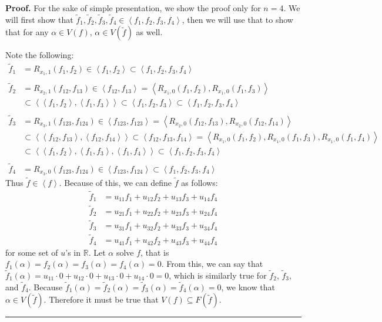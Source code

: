 \documentclass{article}%
\newenvironment{proof}[1][Proof]{\noindent\textbf{#1.} }{\ \rule{0.5em}{0.5em}}
\begin{document}
\begin{proof}
For the sake of simple presentation, we show the proof only for $n=4$. We will first show that $\tilde{f}_1,\tilde{f}_2,\tilde{f}_3,\tilde{f}_4\in \left<f_1,f_2,f_3,f_4\right>$, then we will use that to show that for any $\alpha\in V(f)$, $\alpha\in V(\tilde{f})$ as well.

Note the following:
\begin{align*}
    \tilde{f}_1&=R_{x_1,1}(f_1,f_2)\in \left< f_1,f_2\right>\subset \left< f_1, f_2, f_3, f_4 \right>\\
    \\
    \tilde{f}_{2}  &  =R_{x_{2},1}\left(  f_{12},f_{13}\right) \in \left<f_{12},f_{13}\right>=\left<   R_{x_1,0}\left(f_1,f_2\right),R_{x_1,0}\left(f_1,f_3\right) \right> \\
    &\subset \left<\left<f_1,f_2\right>,\left<f_1,f_3\right>\right>\subset \left<f_1,f_2,f_3\right>\subset\left<f_1,f_2,f_3,f_4\right>\\
    \\
    \tilde{f}_{3}  &  =R_{x_{3},1}\left(  f_{123},f_{124}\right) \in \left<f_{123},f_{123}\right>=\left<R_{x_2,0}(f_{12},f_{13}),R_{x_2,0}(f_{12},f_{14})\right>\\
    &\subset\left<\left<f_{12},f_{13}\right>,\left<f_{12},f_{14}\right>\right> \subset \left<f_{12},f_{13},f_{14}\right> = \left<R_{x_1,0}(f_1,f_2),R_{x_1,0}(f_1,f_3),R_{x_1,0}(f_1,f_4)\right>\\
    &\subset \left<\left<f_1,f_2\right>,\left<f_1,f_3\right>,\left<f_1,f_4\right>\right> \subset \left<f_1,f_2,f_3,f_4\right>\\
    \\
\tilde{f}_{4}  &  =R_{x_3,0}\left(f_{123},f_{124}\right) \in \left<f_{123},f_{124}\right> \subset \left<f_1,f_2,f_3,f_4\right>
\end{align*}
Thus $\tilde{f}\in\left< f \right>$. Because of this, we can define $\tilde{f}$ as follows:
\begin{align*}
\tilde{f}_1&=u_{11}f_1+u_{12}f_2+u_{13}f_3+u_{14}f_4\\
\tilde{f}_2&=u_{21}f_1+u_{22}f_2+u_{23}f_3+u_{24}f_4\\
\tilde{f}_3&=u_{31}f_1+u_{32}f_2+u_{33}f_3+u_{34}f_4\\
\tilde{f}_4&=u_{41}f_1+u_{42}f_2+u_{43}f_3+u_{44}f_4
\end{align*}
for some set of $u$'s in $\mathbb{R}$. Let $\alpha$ solve $f$, that is $f_1(\alpha)=f_2(\alpha)=f_3(\alpha)=f_4(\alpha)=0$. From this, we can say that $\tilde{f}_1(\alpha)=u_{11}\cdot 0 + u_{12}\cdot 0 + u_{13}\cdot 0 + u_{14}\cdot 0 = 0$, which is similarly true for $\tilde{f}_2$, $\tilde{f}_3$, and $\tilde{f}_4$. Because $\tilde{f}_1(\alpha)=\tilde{f}_2(\alpha)=\tilde{f}_3(\alpha)=\tilde{f}_4(\alpha)=0$, we know that $\alpha\in V(\tilde{f})$. Therefore it must be true that $V(f)\subseteq F(\tilde{f})$.
\end{proof}
\end{document}

